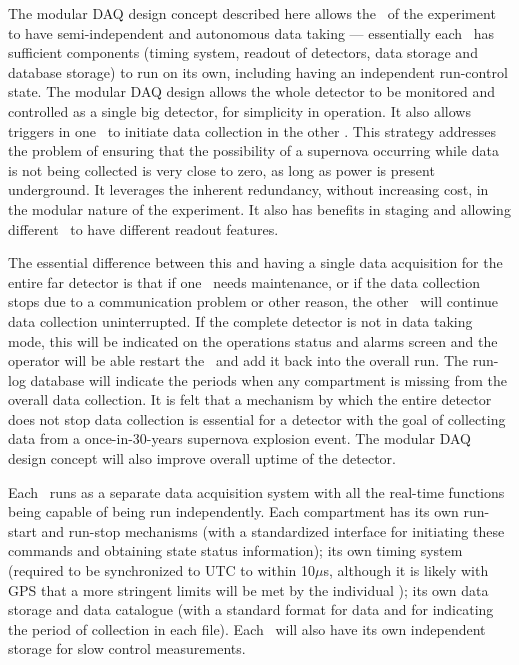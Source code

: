 The modular DAQ design concept described here allows the
\COMPARTMENTS\ of the experiment to have semi-independent and
autonomous data taking --- essentially each \COMPARTMENT\ has sufficient
components (timing system, readout of detectors, data storage and
database storage) to run on its own, including having an independent
run-control state.  The modular DAQ design allows the whole detector to
be monitored and controlled as a single big detector, for simplicity
in operation.  It also allows triggers in one \COMPARTMENT\ to initiate
data collection in the other \COMPARTMENTS.
This strategy addresses the problem of ensuring that the possibility
of a supernova occurring while data is not being collected is very
close to zero, as long as power is present
underground.  It leverages the inherent redundancy, without
increasing cost, in the modular nature of the experiment.
It also has benefits in staging and allowing different \COMPARTMENTS\ 
to have different readout features.

The essential difference between this and having a single data
acquisition for the entire far detector is that if one \COMPARTMENT\
needs maintenance, or if the data collection stops due to a
communication problem or other reason, the other \COMPARTMENTS\ will
continue data collection uninterrupted.  If the complete detector is
not in data taking mode, this will be indicated on the operations
status and alarms screen and the operator will be able restart the
\COMPARTMENT\ and add it back into the overall run.  The run-log
database will indicate the periods when any compartment is missing
from the overall data collection.  It is felt that a mechanism by
which the entire detector does not stop data collection is essential
for a detector with the goal of collecting data from a
once-in-30-years supernova explosion event.  The modular DAQ design
concept will also improve overall uptime of the detector.

Each \COMPARTMENT\ runs as a separate data acquisition system with all
the real-time functions being capable of being run independently.
Each compartment has its own run-start and run-stop mechanisms (with a
standardized interface for initiating these commands and obtaining
state status information); its own timing system (required to be
synchronized to UTC to within 10$\mu$s, although it is likely with GPS
that a more stringent limits will be met by the individual
\COMPARTMENTS); its own data storage and data catalogue (with
a standard format for data and for indicating the period of collection
in each file).   Each \COMPARTMENT\ will also have its own independent
storage for slow control measurements.

